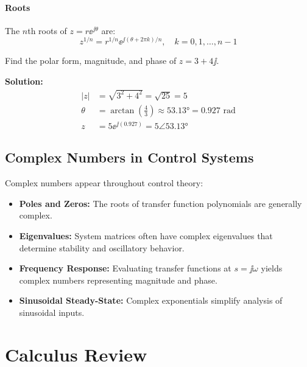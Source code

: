 \subsubsection{Roots}
The $n$th roots of $z = r\ee^{\jj\theta}$ are:
\begin{equation}
z^{1/n} = r^{1/n} \ee^{\jj(\theta + 2\pi k)/n}, \quad k = 0, 1, \ldots, n-1
\end{equation}

\begin{examplebox}[title=Example 0.1: Complex Number Operations]
Find the polar form, magnitude, and phase of $z = 3 + 4\jj$.

\textbf{Solution:}
\begin{align}
|z| &= \sqrt{3^2 + 4^2} = \sqrt{25} = 5 \\
\theta &= \arctan\left(\frac{4}{3}\right) \approx 53.13° = 0.927 \text{ rad} \\
z &= 5\ee^{\jj(0.927)} = 5\angle 53.13°
\end{align}
\end{examplebox}

\section{Complex Numbers in Control Systems}

Complex numbers appear throughout control theory:

\begin{itemize}
    \item \textbf{Poles and Zeros:} The roots of transfer function polynomials are generally complex.
    \item \textbf{Eigenvalues:} System matrices often have complex eigenvalues that determine stability and oscillatory behavior.
    \item \textbf{Frequency Response:} Evaluating transfer functions at $s = \jj\omega$ yields complex numbers representing magnitude and phase.
    \item \textbf{Sinusoidal Steady-State:} Complex exponentials simplify analysis of sinusoidal inputs.
\end{itemize}

\chapter{Calculus Review}
\label{ch:calculus}


